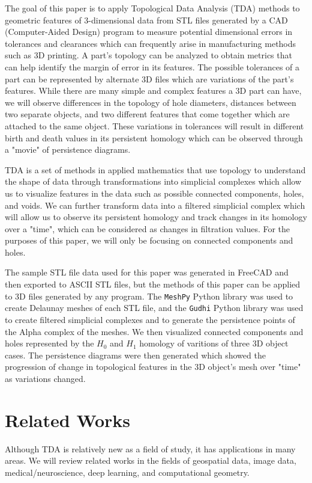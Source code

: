 \documentclass[ma]{uncgdissertationexp}
\theoremstyle{plain}
\theoremstyle{definition}
\theoremstyle{remark}
\begin{document}
\par The goal of this paper is to apply Topological Data Analysis (TDA) methods to geometric features of 3-dimensional data from STL files generated by a CAD (Computer-Aided Design) program to measure potential dimensional errors in tolerances and clearances which can frequently arise in manufacturing methods such as 3D printing. A part's topology can be analyzed to obtain metrics that can help identify the margin of error in its features. The possible tolerances of a part can be represented by alternate 3D files which are variations of the part's features. While there are many simple and complex features a 3D part can have, we will observe differences in the topology of hole diameters, distances between two separate objects, and two different features that come together which are attached to the same object. These variations in tolerances will result in different birth and death values in its persistent homology which can be observed through a "movie" of persistence diagrams.
\par TDA is a set of methods in applied mathematics that use topology to understand the shape of data through transformations into simplicial complexes which allow us to visualize features in the data such as possible connected components, holes, and voids. We can further transform data into a filtered simplicial complex which will allow us to observe its persistent homology and track changes in its homology over a "time", which can be considered as changes in filtration values. For the purposes of this paper, we will only be focusing on connected components and holes. 
\par The sample STL file data used for this paper was generated in FreeCAD and then exported to ASCII STL files, but the methods of this paper can be applied to 3D files generated by any program. The \verb"MeshPy" Python library was used to create Delaunay meshes of each STL file, and the \verb"Gudhi" Python library was used to create filtered simplicial complexes and to generate the persistence points of the Alpha complex of the meshes. We then visualized connected components and holes represented by the $H_0$ and $H_1$ homology of varitions of three 3D object cases. The persistence diagrams were then generated which showed the progression of change in topological features in the 3D object's mesh over "time" as variations changed.
\section{Related Works}
\par Although TDA is relatively new as a field of study, it has applications in many areas. We will review related works in the fields of geospatial data, image data, medical/neuroscience, deep learning, and computational geometry.
\end{document}
